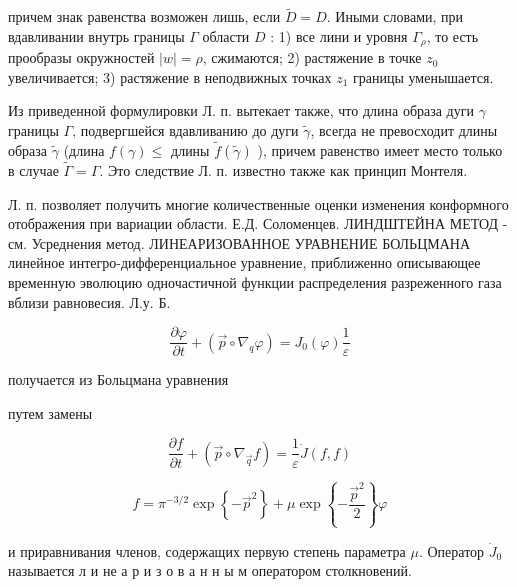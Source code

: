 \documentclass[10pt]{article}
\begin{document}
причем знак равенства возможен лишь, если $\widetilde{D}=D$. Иными словами, при вдавливании внутрь границы $\Gamma$ области $D$ : 1) все лини и уровня $\Gamma_{\rho}$, то есть прообразы окружностей $|w|=\rho$, сжимаются; 2) растяжение в точке $z_{0}$ увеличивается; 3) растяжение в неподвижных точках $z_{1}$ границы уменышается.



Из приведенной формулировки Л. п. вытекает также, что длина образа дуги $\gamma$ границы $\Gamma$, подвергшейся вдавливанию до дуги $\tilde{\gamma}$, всегда не превосходит длины образа $\tilde{\gamma}$ (длина $f(\gamma) \leqslant$ длины $\tilde{f}(\tilde{\gamma})$ ), причем равенство имеет место только в случае $\tilde{\Gamma}=\Gamma$. Это следствие Л. п. известно также как принцип Монтеля.



Л. п. позволяет получить многие количественные оценки изменения конформного отображения при вариации области. Е.Д. Соломенцев. ЛИНДШТЕЙНА МЕТОД - см. Усреднения метод. ЛИНЕАРИЗОВАННОЕ УРАВНЕНИЕ БОЛЬЦМАНА линейное интегро-дифференциальное уравнение, приближенно описывающее временную эволюцию одночастичной функции распределения разреженного газа вблизи равновесия. Л.у. Б.



\[

\frac{\partial \varphi}{\partial t}+\left(\vec{p} \circ \nabla_{q} \varphi\right)=J_{0}(\varphi) \frac{1}{\varepsilon}

\]



получается из Больцмана уравнения



путем замены



\[

\frac{\partial f}{\partial t}+\left(\vec{p} \circ \nabla_{\vec{q}} f\right)=\frac{1}{\varepsilon} \dot{J}(f, f)

\]



\[

f=\pi^{-3 / 2} \exp \left\{-\vec{p}^{2}\right\}+\mu \exp \left\{-\frac{\vec{p}^{2}}{2}\right\} \varphi

\]



и приравнивания членов, содержащих первую степень параметра $\mu$. Оператор $\dot{J}_{0}$ называется л и не а р и з о в а н н ы м оператором столкновений.
\end{document}
